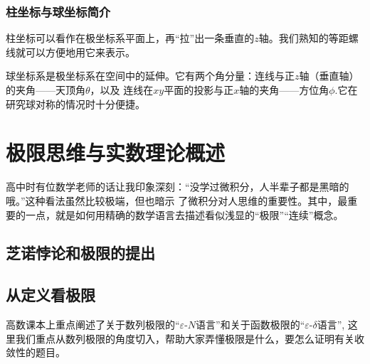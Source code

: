 \begin{center}
    \quad
\end{center}

\subsubsection{柱坐标与球坐标简介}
柱坐标可以看作在极坐标系平面上，再“拉”出一条垂直的$z$轴。我们熟知的等距螺线就可以方便地用它来表示。

球坐标系是极坐标系在空间中的延伸。它有两个角分量：连线与正$z$轴（垂直轴）的夹角——天顶角$\theta$，以及
连线在$xy$平面的投影与正$x$轴的夹角——方位角$\phi$.它在研究球对称的情况时十分便捷。
\section{极限思维与实数理论概述}
高中时有位数学老师的话让我印象深刻：“没学过微积分，人半辈子都是黑暗的哦。”这种看法虽然比较极端，但也暗示
了微积分对人思维的重要性。其中，最重要的一点，就是如何用精确的数学语言去描述看似浅显的“极限”“连续”概念。

\subsection{芝诺悖论和极限的提出}

\subsection{从定义看极限}\label{continous property}
高数课本上重点阐述了关于数列极限的“$\varepsilon  \text{-} N$语言”和关于函数极限的“$\varepsilon  \text{-} \delta$语言”,
这里我们重点从数列极限的角度切入，帮助大家弄懂极限是什么，要怎么证明有关收敛性的题目。


